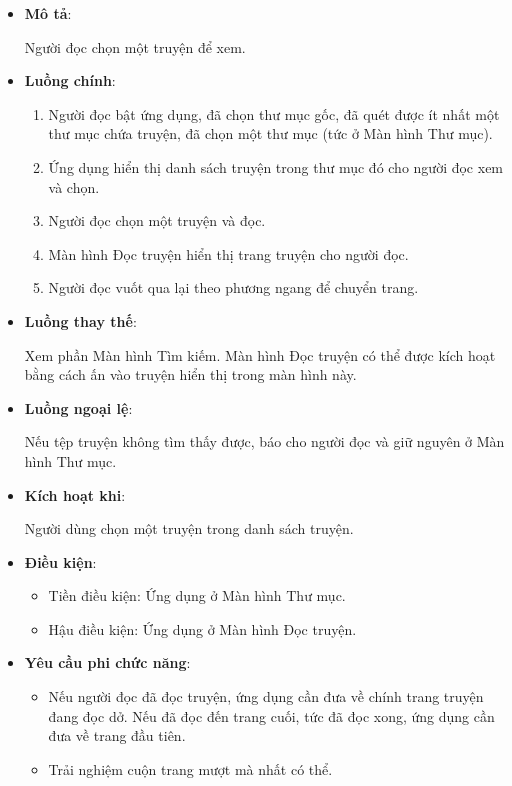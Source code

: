 \documentclass[../../thesis]{subfiles}
\begin{document}
\begin{itemize}
    \item
        \textbf{Mô tả}:

        Người đọc chọn một truyện để xem.
    \item
        \textbf{Luồng chính}:

        \begin{enumerate}
            \item
                Người đọc bật ứng dụng, đã chọn thư mục gốc, đã quét được ít
                nhất một thư mục chứa truyện, đã chọn một thư mục (tức ở Màn
                hình Thư mục).
            \item
                Ứng dụng hiển thị danh sách truyện trong thư mục đó cho người
                đọc xem và chọn.
            \item
                Người đọc chọn một truyện và đọc.
            \item
                Màn hình Đọc truyện hiển thị trang truyện cho người đọc.
            \item
                Người đọc vuốt qua lại theo phương ngang để chuyển trang.
        \end{enumerate}
    \item
        \textbf{Luồng thay thế}:

        Xem phần Màn hình Tìm kiếm. Màn hình Đọc truyện có thể được kích hoạt
        bằng cách ấn vào truyện hiển thị trong màn hình này.
    \item
        \textbf{Luồng ngoại lệ}:

        Nếu tệp truyện không tìm thấy được, báo cho người đọc và giữ nguyên ở
        Màn hình Thư mục.
    \item
        \textbf{Kích hoạt khi}:

        Người dùng chọn một truyện trong danh sách truyện.
    \item
        \textbf{Điều kiện}:

        \begin{itemize}
            \item
                Tiền điều kiện: Ứng dụng ở Màn hình Thư mục.
            \item
                Hậu điều kiện: Ứng dụng ở Màn hình Đọc truyện.
        \end{itemize}
    \item
        \textbf{Yêu cầu phi chức năng}:

        \begin{itemize}
            \item
                Nếu người đọc đã đọc truyện, ứng dụng cần đưa về chính trang
                truyện đang đọc dở. Nếu đã đọc đến trang cuối, tức đã đọc xong,
                ứng dụng cần đưa về trang đầu tiên.
            \item
                Trải nghiệm cuộn trang mượt mà nhất có thể.
        \end{itemize}
  \end{itemize}
\end{document}
